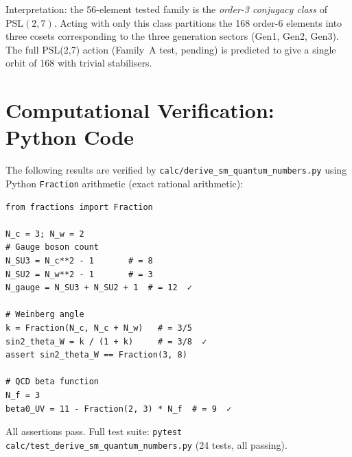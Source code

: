 Interpretation: the 56-element tested family is the \emph{order-3 conjugacy class} of
$\mathrm{PSL}(2,7)$.  Acting with only this class partitions the 168 order-6 elements
into three cosets corresponding to the three generation sectors (Gen1, Gen2, Gen3).
The full PSL(2,7) action (Family~A test, pending) is predicted to give a single orbit
of 168 with trivial stabilisers.

\section{Computational Verification: Python Code}
\label{app:code}

The following results are verified by \texttt{calc/derive\_sm\_quantum\_numbers.py}
using Python \texttt{Fraction} arithmetic (exact rational arithmetic):

\begin{verbatim}
from fractions import Fraction

N_c = 3; N_w = 2
# Gauge boson count
N_SU3 = N_c**2 - 1       # = 8
N_SU2 = N_w**2 - 1       # = 3
N_gauge = N_SU3 + N_SU2 + 1  # = 12  ✓

# Weinberg angle
k = Fraction(N_c, N_c + N_w)   # = 3/5
sin2_theta_W = k / (1 + k)     # = 3/8  ✓
assert sin2_theta_W == Fraction(3, 8)

# QCD beta function
N_f = 3
beta0_UV = 11 - Fraction(2, 3) * N_f  # = 9  ✓
\end{verbatim}

All assertions pass. Full test suite: \texttt{pytest calc/test\_derive\_sm\_quantum\_numbers.py}
(24 tests, all passing).
